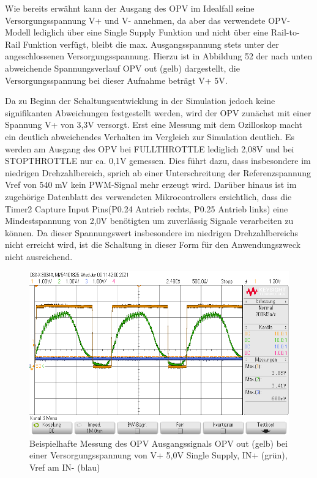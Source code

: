 Wie bereits erwähnt kann der Ausgang des OPV im Idealfall seine Versorgungsspannung V+ und V- annehmen, da aber das verwendete OPV-Modell lediglich über eine Single Supply Funktion und nicht über eine Rail-to-Rail Funktion verfügt, bleibt die max. Ausgangsspannung stets unter der angeschlossenen Versorgungsspannung. Hierzu ist in Abbildung 52 der nach unten abweichende Spannungsverlauf OPV out (gelb) dargestellt, die Versorgungsspannung bei dieser Aufnahme beträgt V+ 5V.\vspace{11pt}

Da zu Beginn der Schaltungsentwicklung in der Simulation jedoch keine signifikanten Abweichungen festgestellt werden, wird der OPV zunächst mit einer Spannung V+ von 3,3V versorgt. Erst eine Messung mit dem Ozilloskop macht ein deutlich abweichendes Verhalten im Vergleich zur Simulation deutlich. Es werden am Ausgang des OPV bei FULLTHROTTLE lediglich 2,08V und bei \glqq{}STOPTHROTTLE \grqq{} nur ca. 0,1V gemessen. Dies führt dazu, dass insbesondere im niedrigen Drehzahlbereich, sprich ab einer Unterschreitung der Referenzspannung Vref von 540 mV kein PWM-Signal mehr erzeugt wird. Darüber hinaus ist im zugehörige Datenblatt des verwendeten Mikrocontrollers ersichtlich, dass die Timer2 Capture Input Pins(P0.24 Antrieb rechts, P0.25 Antrieb links) eine Mindestspannung von 2,0V benötigten um zuverlässig Signale verarbeiten zu können. Da dieser Spannungswert insbesondere im niedrigen Drehzahlbereichs nicht erreicht wird, ist die Schaltung in dieser Form für den Anwendungszweck nicht ausreichend.\vspace{11pt}

\begin{figure}[H] %
\includegraphics[width=.95\textwidth]{sec4/images/inp_inref_opv_out} 
\centering
\captionsetup{width=.95\textwidth}
\caption[inp\_inref\_opv\_out]{Beispielhafte Messung des OPV Ausgangssignals OPV out (gelb) bei einer Versorgungsspannung von V+ 5,0V Single Supply,  IN+ (grün), Vref am IN- (blau)}\centering
\label{inpInrefOpvOut}
\end{figure}


